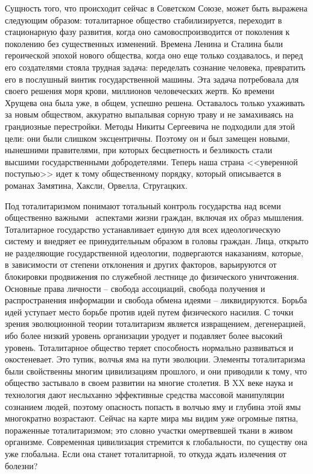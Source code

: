 \documentclass{book}
\begin{document}
Сущность того, что происходит сейчас в Советском Союзе, может быть выражена следующим образом: тоталитарное общество 
стабилизируется, переходит в стационарную фазу развития, когда оно самовоспроизводится от поколения к поколению без существенных 
изменений. Времена Ленина и Сталина были героической эпохой нового общества, когда оно еще только создавалось, и перед его 
создателями стояла трудная задача: переделать сознание человека, превратить его в послушный винтик государственной машины. Эта 
задача потребовала для своего решения моря крови, миллионов человеческих жертв. Ко времени Хрущева она была уже, в общем, 
успешно решена. Оставалось только ухаживать за новым обществом, аккуратно выпалывая сорную траву и не замахиваясь на гран­диозные 
перестройки. Методы Никиты Сергеевича не подхо­дили для этой цели: они были слишком эксцентричны. Поэтому он и был замещен 
новыми, нынешними правителями, при которых бесцветность и безликость стали высшими государственными добродетелями. Теперь наша 
страна <<уверенной поступью>> идет к тому общественному порядку, который описывается в романах Замятина, Хаксли, Орвелла, Стругацких.

Под тоталитаризмом понимают тотальный контроль государства над всеми общественно важными  аспектами жизни граждан, включая их образ мышления. Тоталитарное государ­ство устанавливает единую для всех идеологическую систему и внедряет ее принудительным образом в головы граждан. Лица, открыто не разделяющие государственной идеологии, подвергаются наказаниям, которые, в зависимости от степени отклонения и других факторов, варьируются от блокировки продвижения по служебной лестнице до физического уничтожения. Основные права личности -- свобода ассоциаций, свобода получения и распространения информации и свобода обмена идеями -- ликвидируются. Борьба идей уступает место борьбе против  идей путем физического насилия. С точки зрения эволюционной теории тоталитаризм является извращением, дегенерацией, ибо более низкий уровень организации уродует и подавляет более высокий уровень. Тоталитарное общество теряет способность нормально развиваться и око­стеневает. Это тупик, волчья яма на пути эволюции.
Элементы тоталитаризма были свойственны многим циви­лизациям прошлого, и они приводили к тому, что общество застывало в своем 
развитии на многие столетия. В XX веке наука и технология дают неслыханно эффективные средства массовой манипуляции сознанием 
людей, поэтому опасность попасть в волчью яму и глубина этой ямы многократно возрастают. Сейчас на карте мира мы видим уже 
огромные пятна, пораженные тоталитаризмом; это словно участки омертвевшей ткани в живом организме. Современная цивилизация 
стремится к глобальности, по существу она уже глобальна. Если она станет тоталитарной, то откуда ждать излечения от болезни?
\end{document}

